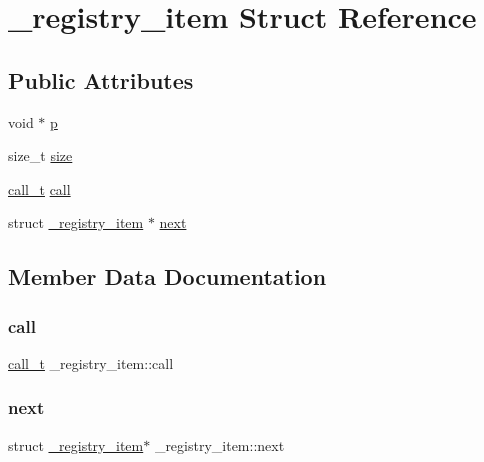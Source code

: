 \hypertarget{struct__registry__item}{}\section{\+\_\+registry\+\_\+item Struct Reference}
\label{struct__registry__item}
\subsection*{Public Attributes}
\begin{DoxyCompactItemize}
\item 
void $\ast$ \hyperlink{struct__registry__item_a7d2b50523d8801a40d30e17bfab37149}{p}
\item 
size\+\_\+t \hyperlink{struct__registry__item_a98122f145c9d8ef6b8e34c534307423d}{size}
\item 
\hyperlink{structcall__t}{call\+\_\+t} \hyperlink{struct__registry__item_ae5167771e18dc20df38808a4dafa761f}{call}
\item 
struct \hyperlink{struct__registry__item}{\+\_\+registry\+\_\+item} $\ast$ \hyperlink{struct__registry__item_aa659ff3f2fa74b37e31b0bd3948bbf7f}{next}
\end{DoxyCompactItemize}


\subsection{Member Data Documentation}
\mbox{\label{struct__registry__item_ae5167771e18dc20df38808a4dafa761f}} 
\subsubsection{\texorpdfstring{call}{call}}
{\footnotesize\ttfamily \hyperlink{structcall__t}{call\+\_\+t} \+\_\+registry\+\_\+item\+::call}

\mbox{\label{struct__registry__item_aa659ff3f2fa74b37e31b0bd3948bbf7f}} 
\subsubsection{\texorpdfstring{next}{next}}
{\footnotesize\ttfamily struct \hyperlink{struct__registry__item}{\+\_\+registry\+\_\+item}$\ast$ \+\_\+registry\+\_\+item\+::next}

